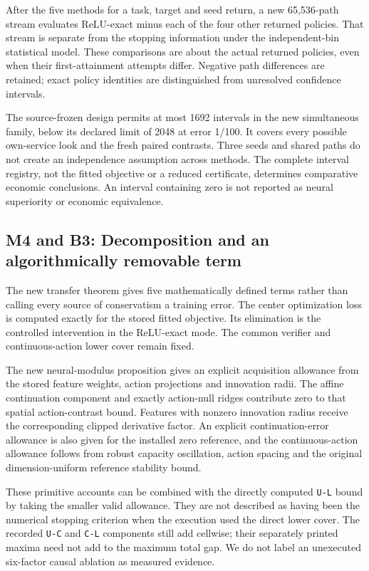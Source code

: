 \documentclass[ecta,nameyear,draft]{econsocart}
\begin{document}
After the five methods for a task, target and seed return, a new
65,536-path stream evaluates ReLU-exact minus each of the four other
returned policies. That stream is separate from the stopping information
under the independent-bin statistical model. These comparisons are about
the actual returned policies, even when their first-attainment attempts
differ. Negative path differences are retained; exact policy identities
are distinguished from unresolved confidence intervals.

The source-frozen design permits at most 1692 intervals in the new
simultaneous family, below its declared limit of 2048 at error 1/100. It
covers every possible own-service look and the fresh paired contrasts.
Three seeds and shared paths do not create an independence assumption
across methods. The complete interval registry, not the fitted objective
or a reduced certificate, determines comparative economic conclusions.
An interval containing zero is not reported as neural superiority or
economic equivalence.

\hypertarget{m4-and-b3-decomposition-and-an-algorithmically-removable-term}{%
\subsection{M4 and B3: Decomposition and an algorithmically removable
term}\label{m4-and-b3-decomposition-and-an-algorithmically-removable-term}}

The new transfer theorem gives five mathematically defined terms rather
than calling every source of conservatism a training error. The center
optimization loss is computed exactly for the stored fitted objective.
Its elimination is the controlled intervention in the ReLU-exact mode.
The common verifier and continuous-action lower cover remain fixed.

The new neural-modulus proposition gives an explicit acquisition
allowance from the stored feature weights, action projections and
innovation radii. The affine continuation component and exactly
action-null ridges contribute zero to that spatial action-contrast
bound. Features with nonzero innovation radius receive the corresponding
clipped derivative factor. An explicit continuation-error allowance is
also given for the installed zero reference, and the continuous-action
allowance follows from robust capacity oscillation, action spacing and
the original dimension-uniform reference stability bound.

These primitive accounts can be combined with the directly computed
\nolinkurl{U-L} bound by taking the smaller valid allowance. They are not
described as having been the numerical stopping criterion when the
execution used the direct lower cover. The recorded \nolinkurl{U-C} and
\nolinkurl{C-L} components still add cellwise; their separately printed
maxima need not add to the maximum total gap. We do not label an
unexecuted six-factor causal ablation as measured evidence.
\end{document}
